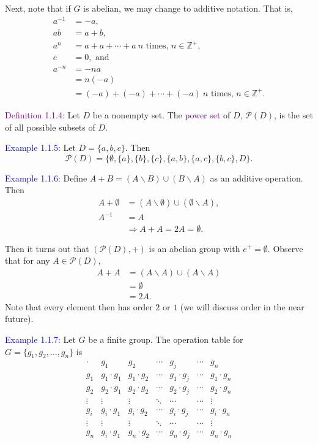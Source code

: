 \documentclass{article}
\begin{document}
Next, note that if $G$ is abelian, we may change to additive notation. That is,
\begin{align*}
    a^{-1} &= -a, \\
    ab &= a+b, \\
    a^n &= a+a+ \cdots +a \ n \text{ times, } n \in \mathbb{Z}^+, \\
    e &=0, \text{ and } \\
    a^{-n}&= -na \\
    &= n(-a) \\
    &= (-a) + (-a) + \cdots + (-a) \ n \text{ times, } n \in \mathbb{Z}^+.
\end{align*}

\textcolor{purple}{Definition 1.1.4:} Let $D$ be a nonempty set. The \textcolor{purple}{power set} of $D$, $\mathcal{P}(D)$, is the set 
of all possible subsets of $D$. 

\textcolor{blue}{Example 1.1.5:} Let $D= \{a,b,c\}$. Then
\[
    \mathcal{P}(D) = \{ \emptyset, \{a\}, \{b\}, \{c\}, \{a,b\}, \{a,c\}, \{b,c\}, D \}.
\]

\textcolor{blue}{Example 1.1.6:} Define $A+B = (A \backslash B) \cup (B \backslash A)$ as an additive operation. Then 
\begin{align*}
    A+\emptyset &= (A \backslash \emptyset) \cup (\emptyset \backslash A), \\
    A^{-1} &= A \\
    &\Longrightarrow A+A = 2A = \emptyset.
\end{align*}

Then it turns out that $(\mathcal{P}(D),+)$ is an abelian group with $e^+ = \emptyset$. Observe that for any $A \in \mathcal{P}(D)$,
\begin{align*}
    A+A &= (A \backslash A) \cup (A \backslash A) \\
    &= \emptyset \\
    &= 2A.
\end{align*}
Note that every element then has order $2$ or $1$ (we will discuss order in the near future).

\textcolor{blue}{Example 1.1.7:} Let $G$ be a finite group. The operation table for $G = \{g_1, g_2, \dots, g_n\}$ is
\[
\begin{array}{c|cccccc}
    \cdot & g_1 & g_2 & \cdots & g_j & \cdots & g_n \\ \hline
    g_1 & g_1 \cdot g_1 & g_1 \cdot g_2 & \cdots & g_1 \cdot g_j & \cdots & g_1 \cdot g_n \\
    g_2 & g_2 \cdot g_1 & g_2 \cdot g_2 & \cdots & g_2 \cdot g_j & \cdots & g_2 \cdot g_n \\
    \vdots & \vdots & \vdots & \ddots & \cdots & \cdots & \vdots \\
    g_i & g_i \cdot g_1 & g_i \cdot g_2 & \cdots & g_i \cdot g_j & \cdots & g_i \cdot g_n \\
    \vdots & \vdots & \vdots & \ddots & \cdots & \cdots & \vdots \\
    g_n & g_i \cdot g_1 & g_n \cdot g_2 & \cdots & g_n \cdot g_j & \cdots & g_n \cdot g_n \\
\end{array}
\]
\end{document}
